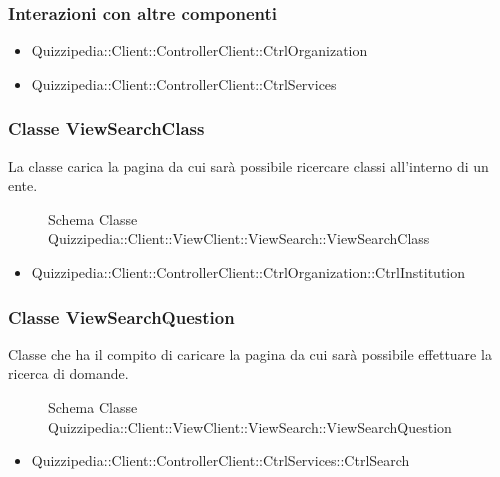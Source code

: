 \subsubsection{Interazioni con altre componenti}
\begin{itemize}
\item Quizzipedia::Client::ControllerClient::CtrlOrganization
\item Quizzipedia::Client::ControllerClient::CtrlServices
\end{itemize}
\subsubsection{Classe ViewSearchClass}
La classe carica la pagina da cui sarà possibile ricercare classi all'interno di un ente.
\begin{figure}[H]
\centering
\noindent{}
\caption{Schema Classe Quizzipedia::Client::ViewClient::ViewSearch::ViewSearchClass}
\end{figure}
\begin{itemize}
\item Quizzipedia::Client::ControllerClient::CtrlOrganization::CtrlInstitution
\end{itemize}
\subsubsection{Classe ViewSearchQuestion}
Classe che ha il compito di caricare la pagina da cui sarà possibile effettuare la ricerca di domande.
\begin{figure}[H]
\centering
\noindent{}
\caption{Schema Classe Quizzipedia::Client::ViewClient::ViewSearch::ViewSearchQuestion}
\end{figure}
\begin{itemize}
\item Quizzipedia::Client::ControllerClient::CtrlServices::CtrlSearch
\end{itemize}
